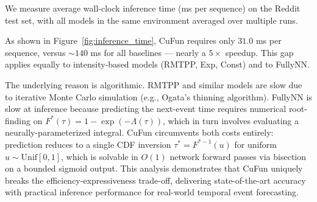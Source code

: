 We measure average wall-clock inference time (ms per sequence) on the
Reddit test set, with all models in the same environment averaged over
multiple runs.

As shown in Figure~\ref{fig:inference_time}, CuFun requires only
$31.0$ ms per sequence, versus $\sim\!140$ ms for all baselines —
nearly a $5\times$ speedup.
This gap applies equally to intensity-based models (RMTPP, Exp, Const)
and to FullyNN.

The underlying reason is algorithmic.
RMTPP and similar models are slow due to iterative Monte Carlo
simulation (e.g., Ogata's thinning algorithm).
FullyNN is slow at inference because predicting the next-event time
requires numerical root-finding on $F^*(\tau)=1-\exp(-\Lambda(\tau))$,
which in turn involves evaluating a neurally-parameterized integral.
CuFun circumvents both costs entirely: prediction reduces to a single
CDF inversion $\tau^* = F^{*-1}(u)$ for uniform $u\sim\mathrm{Unif}[0,1]$,
which is solvable in $O(1)$ network forward passes via bisection on a
bounded sigmoid output.
This analysis demonstrates that CuFun uniquely breaks the
efficiency-expressiveness trade-off, delivering state-of-the-art
accuracy with practical inference performance for real-world temporal
event forecasting.
